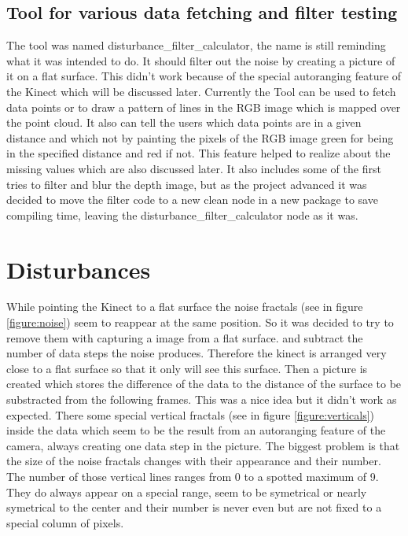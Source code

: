 \subsection{Tool for various data fetching and filter testing}
The tool was named disturbance\_filter\_calculator, the name is still reminding what it was intended to do. It should
filter out the noise by creating a picture of it on a flat surface. This didn't work because of the special autoranging
feature of the Kinect which will be discussed later. Currently the Tool can be used to fetch data points or to
draw a pattern of lines in the RGB image which is mapped over the point cloud. It also can tell the users which data points
are in a given distance and which not by painting the pixels of the RGB image green for being in the specified distance
and red if not. This feature helped to realize about the missing values which are also discussed later. It also includes
some of the first tries to filter and blur the depth image, but as the project advanced it was decided to move the 
filter code to a new clean node in a new package to save compiling time, leaving the disturbance\_filter\_calculator 
node as it was.


\section{Disturbances}
While pointing the Kinect to a flat surface the noise fractals (see in figure \vref{figure:noise}) 
seem to reappear at the same position. So it was decided to try to remove them with capturing a image from a flat surface.
and subtract the number of data steps the noise produces. Therefore the kinect is arranged very close to a flat surface 
so that it only will see this surface. Then a picture is created which stores the difference of the data to the 
distance of the surface to be substracted from the following frames.
This was a nice idea but it didn't work as expected. There some special vertical fractals (see in figure \vref{figure:verticals}) 
inside the data which seem to be the result from an autoranging feature of the camera, 
always creating one data step in the picture. The biggest problem is that the size of the noise fractals changes 
with their appearance and their number. The number of those vertical lines ranges from 0 to a spotted maximum of 9. 
They do always appear on a special range, seem to be symetrical or 
nearly symetrical to the center and their number is never even but are not fixed to a special column of pixels. 

